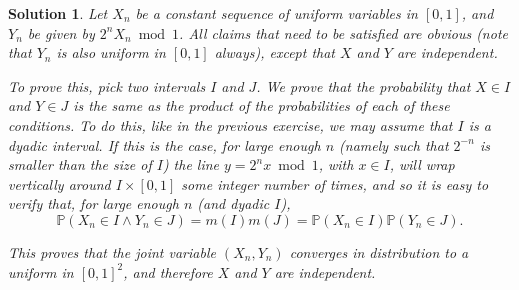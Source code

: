 \documentclass{article}
\theoremstyle{nonumberplain}
\newtheorem{sol}{Solution}
\newcommand{\PP}{\mathbb{P}}
\begin{document}
\begin{sol}
Let $X_n$ be a constant sequence of uniform variables in $[0,1]$, and $Y_n$ be given by $2^n X_n \bmod 1$. All claims that need to be satisfied are obvious (note that $Y_n$ is also uniform in $[0,1]$ always), except that $X$ and $Y$ are independent.

To prove this, pick two intervals $I$ and $J$. We prove that the probability that $X \in I$ and $Y \in J$ is the same as the product of the probabilities of each of these conditions. To do this, like in the previous exercise, we may assume that $I$ is a dyadic interval. If this is the case, for large enough $n$ (namely such that $2^{-n}$ is smaller than the size of $I$) the line $y = 2^n x \bmod 1$, with $x \in I$, will wrap vertically around $I \times [0,1]$ some integer number of times, and so it is easy to verify that, for large enough $n$ (and dyadic $I$),
\begin{equation}
\PP(X_n \in I \land Y_n \in J) = m(I) m(J) = \PP(X_n \in I) \PP(Y_n \in J).
\end{equation}

This proves that the joint variable $(X_n, Y_n)$ converges in distribution to a uniform in $[0,1]^2$, and therefore $X$ and $Y$ are independent.
\end{sol}
\end{document}

